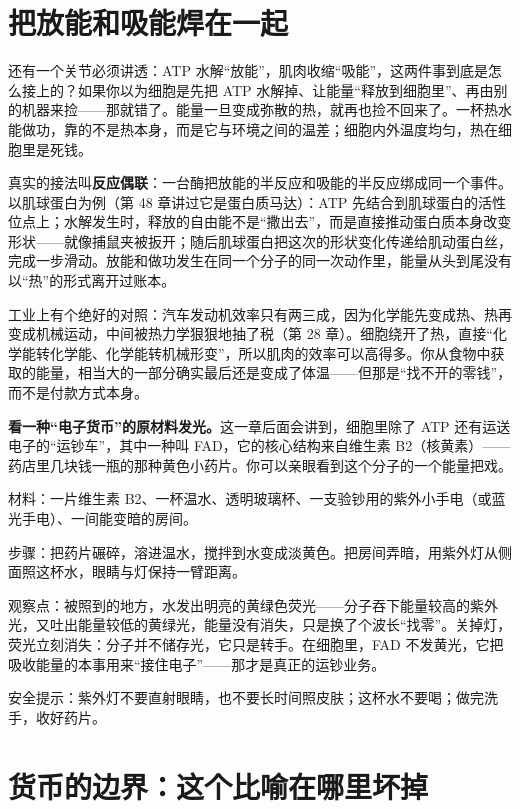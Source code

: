 \section{把放能和吸能焊在一起}

还有一个关节必须讲透：ATP 水解“放能”，肌肉收缩“吸能”，这两件事到底是怎么接上的？如果你以为细胞是先把 ATP 水解掉、让能量“释放到细胞里”、再由别的机器来捡——那就错了。能量一旦变成弥散的热，就再也捡不回来了。一杯热水能做功，靠的不是热本身，而是它与环境之间的温差；细胞内外温度均匀，热在细胞里是死钱。

真实的接法叫\textbf{反应偶联}：一台酶把放能的半反应和吸能的半反应绑成同一个事件。以肌球蛋白为例（第 48 章讲过它是蛋白质马达）：ATP 先结合到肌球蛋白的活性位点上；水解发生时，释放的自由能不是“撒出去”，而是直接推动蛋白质本身改变形状——就像捕鼠夹被扳开；随后肌球蛋白把这次的形状变化传递给肌动蛋白丝，完成一步滑动。放能和做功发生在同一个分子的同一次动作里，能量从头到尾没有以“热”的形式离开过账本。

工业上有个绝好的对照：汽车发动机效率只有两三成，因为化学能先变成热、热再变成机械运动，中间被热力学狠狠地抽了税（第 28 章）。细胞绕开了热，直接“化学能转化学能、化学能转机械形变”，所以肌肉的效率可以高得多。你从食物中获取的能量，相当大的一部分确实最后还是变成了体温——但那是“找不开的零钱”，而不是付款方式本身。

\begin{shiyan}
\textbf{看一种“电子货币”的原材料发光。}这一章后面会讲到，细胞里除了 ATP 还有运送电子的“运钞车”，其中一种叫 FAD，它的核心结构来自维生素 B2（核黄素）——药店里几块钱一瓶的那种黄色小药片。你可以亲眼看到这个分子的一个能量把戏。

材料：一片维生素 B2、一杯温水、透明玻璃杯、一支验钞用的紫外小手电（或蓝光手电）、一间能变暗的房间。

步骤：把药片碾碎，溶进温水，搅拌到水变成淡黄色。把房间弄暗，用紫外灯从侧面照这杯水，眼睛与灯保持一臂距离。

观察点：被照到的地方，水发出明亮的黄绿色荧光——分子吞下能量较高的紫外光，又吐出能量较低的黄绿光，能量没有消失，只是换了个波长“找零”。关掉灯，荧光立刻消失：分子并不储存光，它只是转手。在细胞里，FAD 不发黄光，它把吸收能量的本事用来“接住电子”——那才是真正的运钞业务。

安全提示：紫外灯不要直射眼睛，也不要长时间照皮肤；这杯水不要喝；做完洗手，收好药片。
\end{shiyan}

\section{货币的边界：这个比喻在哪里坏掉}

